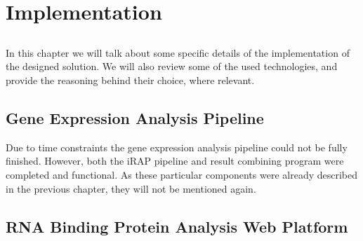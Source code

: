 \chapter{Implementation} \label{chap:implementation}

\section*{}

In this chapter we will talk about some specific details of the implementation
of the designed solution. We will also review some of the used technologies, and
provide the reasoning behind their choice, where relevant.


\section{Gene Expression Analysis Pipeline}


Due to time constraints the gene expression analysis pipeline could not be fully
finished. However, both the iRAP pipeline and result combining program were
completed and functional. As these particular components were already described
in the previous chapter, they will not be mentioned again.

\section{RNA Binding Protein Analysis Web Platform}


